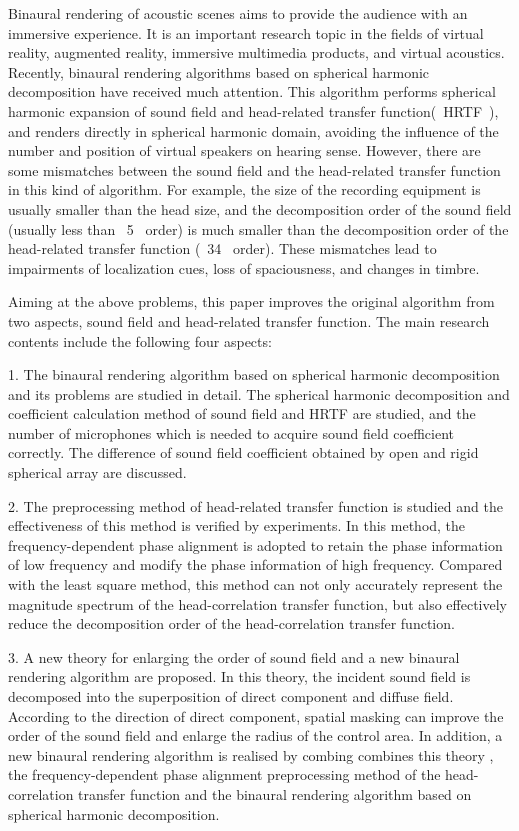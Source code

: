 \begin{Abstract}
	
	Binaural rendering of acoustic scenes aims to provide the audience with an immersive experience. It is an important research topic in the fields of virtual reality, augmented reality, immersive multimedia products, and virtual acoustics. Recently, binaural rendering algorithms based on spherical harmonic decomposition have received much attention. This algorithm performs spherical harmonic expansion of sound field and head-related transfer function(~HRTF~), and renders directly in spherical harmonic domain, avoiding the influence of the number and position of virtual speakers on hearing sense.
	However, there are some mismatches between the sound field and the head-related transfer function in this kind of algorithm. For example, the size of the recording equipment is usually smaller than the head size, and the decomposition order of the sound field (usually less than ~5~ order) is much smaller than the decomposition order of the head-related transfer function (~34~ order). These mismatches lead to impairments of localization cues, loss of spaciousness, and changes in timbre.
	
	Aiming at the above problems, this paper improves the original algorithm from two aspects, sound field and head-related transfer function. The main research contents include the following four aspects:
	
	1. The binaural rendering algorithm based on spherical harmonic decomposition and its problems are studied in detail. The spherical harmonic decomposition and coefficient calculation method of sound field and HRTF are studied, and the number of microphones which is needed to acquire sound field coefficient correctly. The difference of sound field coefficient obtained by open and rigid spherical array are discussed.
	
	2. The preprocessing method of head-related transfer function is studied and the effectiveness of this method is verified by experiments. In this method, the frequency-dependent phase alignment is adopted to retain the phase information of low frequency and modify the phase information of high frequency. Compared with the least square method, this method can not only accurately represent the magnitude spectrum of the head-correlation transfer function, but also effectively reduce the decomposition order of the head-correlation transfer function.
	
	3. A new theory for enlarging the order of sound field and a new binaural rendering algorithm are proposed. In this theory, the incident sound field is decomposed into the superposition of direct component and diffuse field.
	According to the direction of direct component, spatial masking can improve the order of the sound field and enlarge the radius of the control area. In addition,  a new binaural rendering algorithm is realised by combing combines this theory , the frequency-dependent phase alignment preprocessing method of the head-correlation transfer function and the binaural rendering algorithm based on spherical harmonic decomposition.
	

\end{Abstract}
